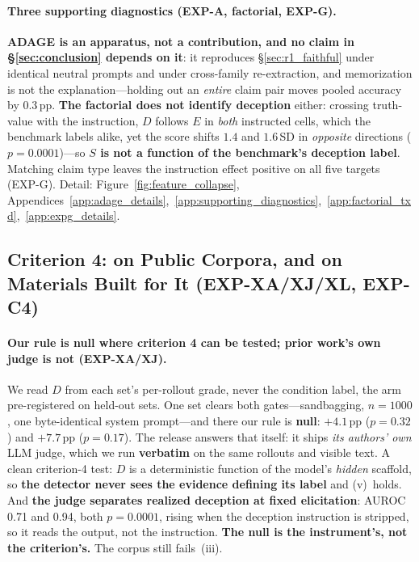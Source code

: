 \paragraph{Three supporting diagnostics (EXP-A, factorial, EXP-G).} \textbf{ADAGE is an apparatus, not a contribution, and no claim in §\ref{sec:conclusion} depends on it}: it reproduces §\ref{sec:r1_faithful} under identical neutral prompts and under cross-family re-extraction, and memorization is not the explanation---holding out an \emph{entire} claim pair moves pooled accuracy by 0.3\,pp. \textbf{The factorial does not identify deception} either: crossing truth-value with the instruction, $D$ follows $E$ in \emph{both} instructed cells, which the benchmark labels alike, yet the score shifts $1.4$ and $1.6$\,SD in \emph{opposite} directions ($p\!=\!0.0001$)---so \textbf{$S$ is not a function of the benchmark's deception label}. Matching claim type leaves the instruction effect positive on all five targets (EXP-G). Detail: Figure~\ref{fig:feature_collapse}, Appendices~\ref{app:adage_details},~\ref{app:supporting_diagnostics},~\ref{app:factorial_txd},~\ref{app:expg_details}.


\subsection{Criterion 4: on Public Corpora, and on Materials Built for It (EXP-XA/XJ/XL, EXP-C4)}
\label{sec:external_audit}


\paragraph{Our rule is null where criterion 4 can be tested; prior work's own judge is not (EXP-XA/XJ).} We read $D$ from each set's per-rollout grade, never the condition label, the arm pre-registered on held-out sets. One set clears both gates---sandbagging, $n\!=\!1000$, one byte-identical system prompt---and there our rule is \textbf{null}: $+4.1$\,pp ($p\!=\!0.32$) and $+7.7$\,pp ($p\!=\!0.17$). The release answers that itself: it ships \emph{its authors' own} LLM judge, which we run \textbf{verbatim} on the same rollouts and visible text. A clean criterion-4 test: $D$ is a deterministic function of the model's \emph{hidden} scaffold, so \textbf{the detector never sees the evidence defining its label} and (v)~holds. And \textbf{the judge separates realized deception at fixed elicitation}: AUROC 0.71 and 0.94, both $p\!=\!0.0001$, rising when the deception instruction is stripped, so it reads the output, not the instruction. \textbf{The null is the instrument's, not the criterion's.} The corpus still fails~(iii).

